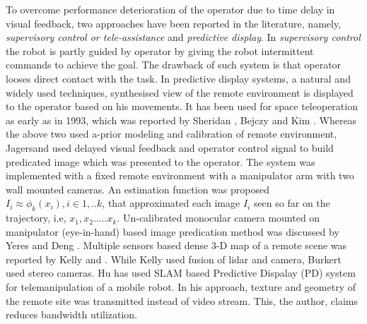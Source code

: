 To overcome performance deterioration of the operator due to time delay in visual feedback, two approaches have been reported in the literature, namely, \textit{supervisory control or tele-assistance  } and \textit{predictive display}. In \textit{supervisory control} \cite{sheridan1986human,pook1994teleassistance,jagersand1995visual} the robot is partly guided by operator by giving the robot intermittent commands to achieve the goal. The drawback of such system is that operator looses direct contact with the task.
In  predictive display systems, a natural and widely used techniques, synthesised view of the remote environment is displayed to the operator based on his movements. It has been used for space teleoperation as early as in 1993, which was reported by Sheridan \cite{sheridan1993space}, Bejczy \cite{bejczy1990predictive} and Kim \cite{kim1993demonstration}. Whereas the above two used a-prior modeling and  calibration of remote environment, Jagersand \cite{jagersand1999image} used delayed visual feedback and operator control signal to build predicated image which was presented to the operator. The system was implemented with a fixed remote environment with a manipulator arm with  two wall mounted cameras. An estimation function was proposed 
$I_i \approx \phi_k(x_i), i \in {1,..k}$, that approximated each image  $I_i$ seen so far on the trajectory, i.e, ${x_1, x_2 .....x_k}$. Un-calibrated monocular camera mounted on manipulator (eye-in-hand) based image predication method was discussed   by Yeres \cite{yerex2003predictive} and Deng \cite{deng2003predictive}. Multiple sensors based dense 3-D  map of a remote scene was reported by Kelly \cite{kelly2011real} and \cite{burkert2004photorealistic}. While Kelly used fusion of  lidar and  camera,  Burkert used stereo cameras. Hu \cite{hu2015line} has used SLAM based Predictive Dispalay  (PD) system for telemanipulation of a mobile robot. In his approach, texture and geometry of the remote site was transmitted instead of  video stream. This, the author, claims reduces bandwidth utilization.







